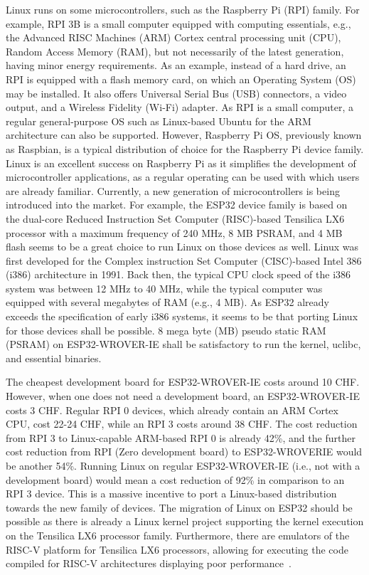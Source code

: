 Linux runs on some microcontrollers, such as the Raspberry Pi (RPI) family. For example, RPI 3B is a small computer equipped with computing essentials, e.g., the Advanced RISC Machines (ARM) Cortex central processing unit (CPU), Random Access Memory (RAM), but not necessarily of the latest generation, having minor energy requirements. As an example, instead of a hard drive, an RPI is equipped with a flash memory card, on which an Operating System (OS) may be installed. It also offers Universal Serial Bus (USB) connectors, a video output, and a Wireless Fidelity (Wi-Fi) adapter. As RPI is a small computer, a regular general-purpose OS such as Linux-based Ubuntu for the ARM architecture can also be supported. However, Raspberry Pi OS, previously known as Raspbian, is a typical distribution of choice for the Raspberry Pi device family. Linux is an excellent success on Raspberry Pi as it simplifies the development of microcontroller applications, as a regular operating can be used with which users are already familiar. Currently, a new generation of microcontrollers is being introduced into the market. For example, the ESP32 device family is based on the dual-core Reduced Instruction Set Computer (RISC)-based Tensilica LX6 processor with a maximum frequency of 240 MHz, 8 MB PSRAM, and 4 MB flash seems to be a great choice to run Linux on those devices as well. Linux was first developed for the Complex instruction Set Computer (CISC)-based Intel 386 (i386) architecture in 1991. Back then, the typical CPU clock speed of the i386 system was between 12 MHz to 40 MHz, while the typical computer was equipped with several megabytes of RAM (e.g., 4 MB). As ESP32 already exceeds the specification of early i386 systems, it seems to be that porting Linux for those devices shall be possible. 8 mega byte (MB) pseudo static RAM (PSRAM) on ESP32-WROVER-IE shall be satisfactory to run the kernel, uclibc, and essential binaries. 

The cheapest development board for ESP32-WROVER-IE costs around 10 CHF. However, when one does not need a development board, an ESP32-WROVER-IE costs 3 CHF. Regular RPI 0 devices, which already contain an ARM Cortex CPU, cost 22-24 CHF, while an RPI 3 costs around 38 CHF. The cost reduction from RPI 3 to Linux-capable ARM-based RPI 0 is already 42\%, and the further cost reduction from RPI (Zero development board) to ESP32-WROVERIE would be another 54\%. Running Linux on regular ESP32-WROVER-IE (i.e., not with a development board) would mean a cost reduction of 92\% in comparison to an RPI 3 device. This is a massive incentive to port a Linux-based distribution towards the new family of devices. The migration of Linux on ESP32 should be possible as there is already a Linux kernel project supporting the kernel execution on the Tensilica LX6 processor family. Furthermore, there are emulators of the RISC-V platform for Tensilica LX6 processors, allowing for executing the code compiled for RISC-V architectures displaying poor performance~\cite{juiceVM}.

